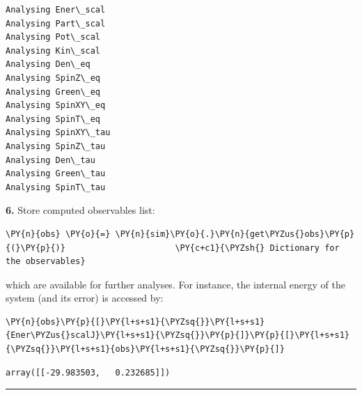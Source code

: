     \begin{Verbatim}[commandchars=\\\{\}]
Analysing Ener\_scal
Analysing Part\_scal
Analysing Pot\_scal
Analysing Kin\_scal
Analysing Den\_eq
Analysing SpinZ\_eq
Analysing Green\_eq
Analysing SpinXY\_eq
Analysing SpinT\_eq
Analysing SpinXY\_tau
Analysing SpinZ\_tau
Analysing Den\_tau
Analysing Green\_tau
Analysing SpinT\_tau
    \end{Verbatim}

    \textbf{6.} Store computed observables list:

    \begin{tcolorbox}[breakable, size=fbox, boxrule=1pt, pad at break*=1mm,colback=cellbackground, colframe=cellborder]
\begin{Verbatim}[commandchars=\\\{\}]
\PY{n}{obs} \PY{o}{=} \PY{n}{sim}\PY{o}{.}\PY{n}{get\PYZus{}obs}\PY{p}{(}\PY{p}{)}                      \PY{c+c1}{\PYZsh{} Dictionary for the observables}
\end{Verbatim}
\end{tcolorbox}

    which are available for further analyses. For instance, the internal
energy of the system (and its error) is accessed by:

    \begin{tcolorbox}[breakable, size=fbox, boxrule=1pt, pad at break*=1mm,colback=cellbackground, colframe=cellborder]
\begin{Verbatim}[commandchars=\\\{\}]
\PY{n}{obs}\PY{p}{[}\PY{l+s+s1}{\PYZsq{}}\PY{l+s+s1}{Ener\PYZus{}scalJ}\PY{l+s+s1}{\PYZsq{}}\PY{p}{]}\PY{p}{[}\PY{l+s+s1}{\PYZsq{}}\PY{l+s+s1}{obs}\PY{l+s+s1}{\PYZsq{}}\PY{p}{]}
\end{Verbatim}
\end{tcolorbox}

            \begin{tcolorbox}[breakable, size=fbox, boxrule=.5pt, pad at break*=1mm, opacityfill=0]
\begin{Verbatim}[commandchars=\\\{\}]
array([[-29.983503,   0.232685]])
\end{Verbatim}
\end{tcolorbox}
        
    \begin{center}\rule{0.5\linewidth}{0.5pt}\end{center}


